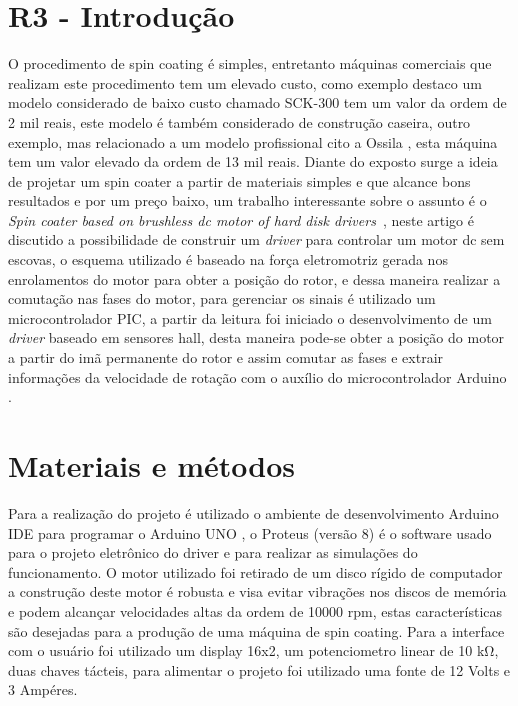 \documentclass[journal]{IEEEtran}
\begin{document}
\section{R3 - Introdução}
O procedimento de spin coating é simples, entretanto máquinas comerciais que realizam este procedimento tem um elevado custo,
como exemplo destaco um modelo considerado de baixo custo chamado SCK-300 \cite{SCK-300} tem um valor da ordem de 2 mil reais, este 
modelo é também considerado de construção caseira, outro exemplo, mas relacionado a um modelo profissional cito
a Ossila \cite{Ossila}, esta máquina tem um valor elevado da ordem de 13 mil reais. Diante do exposto surge a ideia de projetar um
spin coater a partir de materiais simples e que alcance bons resultados e por um preço baixo, um trabalho interessante sobre o assunto é o \textit{Spin coater based on brushless dc motor of hard disk drivers}~\cite{SpinCoater:2006}, neste artigo é discutido a possibilidade de construir um \textit{driver} para controlar um motor dc sem escovas, o esquema utilizado é baseado na força eletromotriz gerada nos enrolamentos do motor para obter a posição do rotor, e dessa maneira realizar a comutação nas fases do motor, para gerenciar os sinais é utilizado um microcontrolador PIC, a partir da leitura foi iniciado o desenvolvimento de um \textit{driver} baseado em sensores hall, desta maneira pode-se obter a posição do motor a partir do imã permanente do rotor e assim comutar as fases e extrair informações da velocidade de rotação com o auxílio do microcontrolador Arduino \cite{Arduino}.

\section{Materiais e métodos}
Para a realização do projeto é utilizado o ambiente de desenvolvimento Arduino IDE para programar o Arduino UNO \cite{Arduino}, o Proteus (versão 8) \cite{Proteus} é o software usado para o projeto eletrônico do driver e para realizar as simulações do funcionamento. O motor utilizado foi retirado de um disco rígido de computador a construção deste motor é robusta e visa evitar vibrações nos discos de memória e podem alcançar velocidades altas da ordem de 10000 rpm, estas características são desejadas para a produção de uma máquina de spin coating. Para a interface com o usuário foi utilizado um display 16x2, um potenciometro linear de 10 kΩ, duas chaves tácteis, para alimentar o projeto foi utilizado uma fonte de 12 Volts e 3 Ampéres. 
\end{document}
